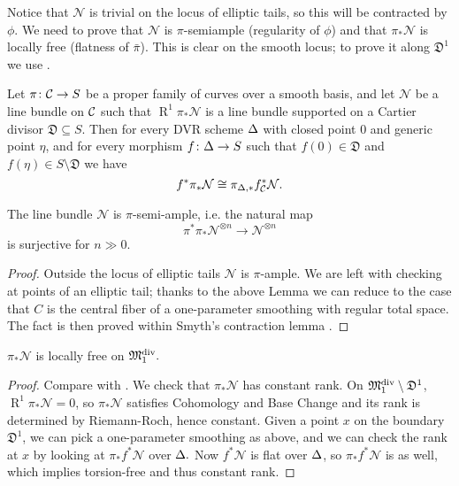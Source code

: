 Notice that $\mathcal N$ is trivial on the locus of elliptic tails, so this will be contracted by $\phi$. We need to prove that $\mathcal N$ is $\pi$-semiample (regularity of $\phi$) and that $\pi_*\mathcal N$ is locally free (flatness of $\bar{\pi}$). This is clear on the smooth locus; to prove it along $\mathfrak D^1$ we use \cite[Lemma~3.7.2.2]{RSPW}.
\begin{lem}\label{DVR}
Let $\pi\colon\mathcal{C}\rightarrow S$ be a proper family of curves over a smooth basis, and let $\mathcal N$ be a line bundle on $\mathcal{C}$ such that $\operatorname{R}^1\pi_*\mathcal N$ is a line bundle supported on a Cartier divisor $\mathfrak D\subseteq S$. Then for every DVR scheme $\Delta$ with closed point $0$ and generic point $\eta$, and for every morphism $f\colon \Delta\rightarrow S$ such that $f(0)\in\mathfrak D$ and $f(\eta)\in S\setminus\mathfrak D$ we have
\[f^*\pi_*\mathcal N\cong \pi_{\Delta,*}f_{\mathcal{C}}^*\mathcal N.\]
\end{lem}

\begin{lem}\label{lemma:semiample}
The line bundle $\mathcal N$ is $\pi$-semi-ample, i.e. the natural map
\[\pi^*\pi_*\mathcal N^{\otimes n}\to \mathcal N^{\otimes n}\]
is surjective for $n\gg 0$.
\end{lem}
\begin{proof}
Outside the locus of elliptic tails $\mathcal N$ is $\pi$-ample. We are left with checking at points of an elliptic tail; thanks to the above Lemma we can reduce to the case that $C$ is the central fiber of a one-parameter smoothing with regular total space. The fact is then proved within Smyth's contraction lemma \cite[Lemma~2.12]{SMY1}.
\end{proof}

\begin{lem}
$\pi_*\mathcal N$ is locally free on $\mathfrak M_1^{\rm{div}}.$
\end{lem}
\begin{proof} Compare with \cite[Proposition~3.7.2.1]{RSPW}.
We check that $\pi_*\mathcal N$ has constant rank.
On $\mathfrak M_1^{\rm{div}}\setminus \mathfrak{D}^1$, $\operatorname{R}^1\pi_*\mathcal N=0$, so $\pi_*\mathcal N$ satisfies Cohomology and Base Change \cite[Theorem III.12.11]{HAR} and its rank is determined by Riemann-Roch, hence constant.
Given a point $x$ on the boundary $\mathfrak{D}^1$, we can pick a one-parameter smoothing as above, and we can check the rank at $x$ by looking at $\pi_*f^*\mathcal N$ over $\Delta.$ Now $f^*\mathcal N$ is flat over $\Delta$, so $\pi_*f^*\mathcal N$ is as well, which implies torsion-free and thus constant rank.
\end{proof}

